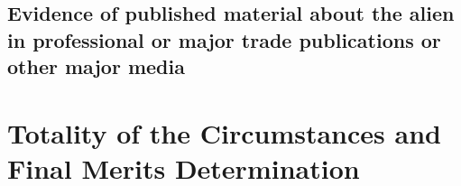 \documentclass[11pt]{article}
\begin{document}
\subsection{Evidence of published material about the alien in professional or major trade publications or other major media}
\label{sec:media}


% 

\section{Totality of the Circumstances and Final Merits Determination}
\label{sec:finalmerits}




\renewcommand\refname{List of Exhibits}
\end{document}
